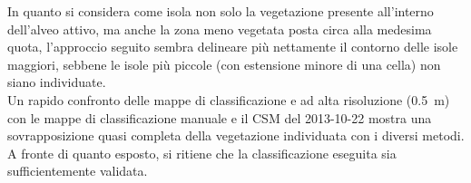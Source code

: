 \begin{description}
	In quanto si considera come isola non solo la vegetazione presente all'interno dell'alveo attivo, ma anche la zona meno vegetata posta circa alla medesima quota, l'approccio seguito sembra delineare più nettamente il contorno delle isole maggiori, sebbene le isole più piccole (con estensione minore di una cella) non siano individuate.
	\\
	Un rapido confronto delle mappe di classificazione \Pl{} e \WV{} ad alta risoluzione (\SI{0.5}{\m}) con le mappe di classificazione manuale e il CSM del 2013-10-22 mostra una sovrapposizione quasi completa della vegetazione individuata con i diversi metodi.
	\\
	A fronte di quanto esposto, si ritiene che la classificazione eseguita sia sufficientemente validata.
\end{description}

